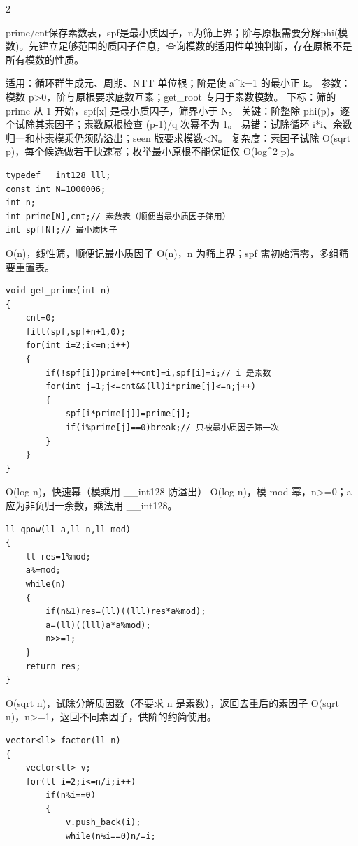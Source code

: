 \documentclass[UTF8,fontset=fandol,a4paper,twoside]{ctexart}
\newcommand{\note}[1]{{\fontsize{10}{12}\selectfont #1\par}}
\begin{document}
\begin{multicols}{2}
\note{prime/\allowbreak{}cnt保存素数表，spf是最小质因子，n为筛上界；阶与原根需要分解phi(\allowbreak{}模数)\allowbreak{}。先建立足够范围的质因子信息，查询模数的适用性单独判断，存在原根不是所有模数的性质。}
\note{适用：循环群生成元、周期、NTT 单位根；阶是使 a\textasciicircum{}k=\allowbreak{}1 的最小正 k。 参数：模数 p>\allowbreak{}0，阶与原根要求底数互素；get\_root 专用于素数模数。 下标：筛的 prime 从 1 开始，spf[\allowbreak{}x]\allowbreak{} 是最小质因子，筛界小于 N。 关键：阶整除 phi(\allowbreak{}p)\allowbreak{}，逐个试除其素因子；素数原根检查 (\allowbreak{}p-\allowbreak{}1)\allowbreak{}/\allowbreak{}q 次幂不为 1。 易错：试除循环 i*i、余数归一和朴素模乘仍须防溢出；seen 版要求模数<\allowbreak{}N。 复杂度：素因子试除 O(\allowbreak{}sqrt p)\allowbreak{}，每个候选做若干快速幂；枚举最小原根不能保证仅 O(\allowbreak{}log\textasciicircum{}2 p)\allowbreak{}。}
\begin{lstlisting}
typedef __int128 lll;
const int N=1000006;
int n;
int prime[N],cnt;// 素数表（顺便当最小质因子筛用）
int spf[N];// 最小质因子
\end{lstlisting}
\note{O(\allowbreak{}n)\allowbreak{}，线性筛，顺便记最小质因子 O(\allowbreak{}n)\allowbreak{}，n 为筛上界；spf 需初始清零，多组筛要重置表。}
\begin{lstlisting}
void get_prime(int n)
{
    cnt=0;
    fill(spf,spf+n+1,0);
    for(int i=2;i<=n;i++)
    {
        if(!spf[i])prime[++cnt]=i,spf[i]=i;// i 是素数
        for(int j=1;j<=cnt&&(ll)i*prime[j]<=n;j++)
        {
            spf[i*prime[j]]=prime[j];
            if(i%prime[j]==0)break;// 只被最小质因子筛一次
        }
    }
}
\end{lstlisting}
\note{O(\allowbreak{}log n)\allowbreak{}，快速幂（模乘用 \_\_int128 防溢出） O(\allowbreak{}log n)\allowbreak{}，模 mod 幂，n>\allowbreak{}=\allowbreak{}0；a 应为非负归一余数，乘法用 \_\_int128。}
\begin{lstlisting}
ll qpow(ll a,ll n,ll mod)
{
    ll res=1%mod;
    a%=mod;
    while(n)
    {
        if(n&1)res=(ll)((lll)res*a%mod);
        a=(ll)((lll)a*a%mod);
        n>>=1;
    }
    return res;
}
\end{lstlisting}
\note{O(\allowbreak{}sqrt n)\allowbreak{}，试除分解质因数（不要求 n 是素数），返回去重后的素因子 O(\allowbreak{}sqrt n)\allowbreak{}，n>\allowbreak{}=\allowbreak{}1，返回不同素因子，供阶的约简使用。}
\begin{lstlisting}
vector<ll> factor(ll n)
{
    vector<ll> v;
    for(ll i=2;i<=n/i;i++)
        if(n%i==0)
        {
            v.push_back(i);
            while(n%i==0)n/=i;

\end{lstlisting}
\end{multicols}
\end{document}
